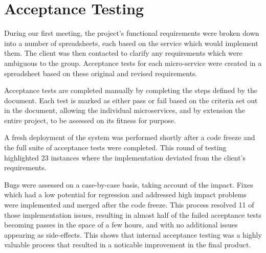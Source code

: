 \section{Acceptance Testing}
\par
During our first meeting, the project's functional requirements were broken down into a number of spreadsheets, each based on the service which would implement them. The client was then contacted to clarify any requirements which were ambiguous to the group. Acceptance tests for each micro-service were created in a spreadsheet based on these original and revised requirements.

\par
Acceptance tests are completed manually by completing the steps defined by the document. Each test is marked as either pass or fail based on the criteria set out in the document, allowing the individual microservices, and by extension the entire project, to be assessed on its fitness for purpose.

\par
A fresh deployment of the system was performed shortly after a code freeze and the full suite of acceptance tests were completed. This round of testing highlighted 23 instances where the implementation deviated from the client's requirements.

\par
Bugs were assessed on a case-by-case basis, taking account of the impact. Fixes which had a low potential for regression and addressed high impact problems were implemented and merged after the code freeze. This process resolved 11 of those implementation issues, resulting in almost half of the failed acceptance tests becoming passes in the space of a few hours, and with no additional issues appearing as side-effects. This shows that internal acceptance testing was a highly valuable process that resulted in a noticable improvement in the final product.
